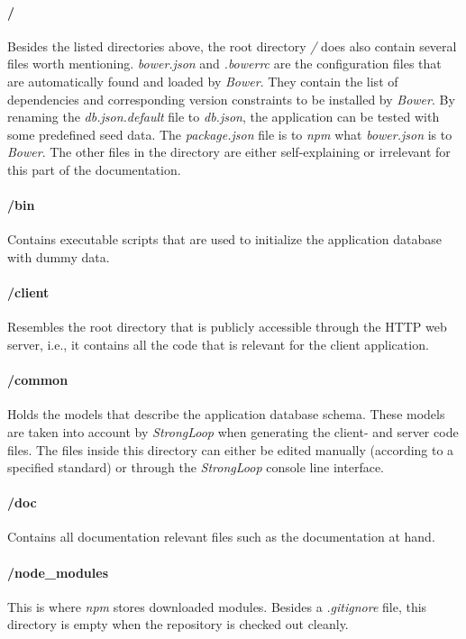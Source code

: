 \documentclass[nochapterpage,nopartpage,noheadingspace,numbersubsubsec,bigchapter,colorback,accentcolor=tud9c,10pt]{tudreport}
\begin{document}
  \paragraph{/}
    Besides the listed directories above, the root directory \emph{/} does also contain several files worth mentioning. \emph{bower.json} and \emph{.bowerrc} are the configuration files that are automatically found and loaded by \emph{Bower}. They contain the list of dependencies and corresponding version constraints to be installed by \emph{Bower}. By renaming the \emph{db.json.default} file to \emph{db.json}, the application can be tested with some predefined seed data. The \emph{package.json} file is to \emph{npm} what \emph{bower.json} is to \emph{Bower}. The other files in the directory are either self-explaining or irrelevant for this part of the documentation.

  \paragraph{/bin}
    Contains executable scripts that are used to initialize the application database with dummy data.

  \paragraph{/client}
    Resembles the root directory that is publicly accessible through the HTTP web server, i.e., it contains all the code that is relevant for the client application.

  \paragraph{/common}
    Holds the models that describe the application database schema. These models are taken into account by \emph{StrongLoop} when generating the client- and server code files. The files inside this directory can either be edited manually (according to a specified standard) or through the \emph{StrongLoop} console line interface.

  \paragraph{/doc}
    Contains all documentation relevant files such as the documentation at hand.

  \paragraph{/node\_modules}
    This is where \emph{npm} stores downloaded modules. Besides a \emph{.gitignore} file, this directory is empty when the repository is checked out cleanly.
\end{document}

